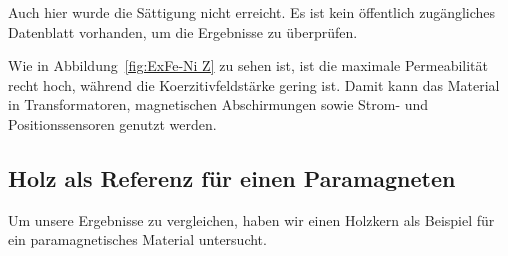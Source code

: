 \documentclass[a4paper,10pt,twocolumn]{article}
\begin{document}
    Auch hier wurde die Sättigung nicht erreicht.
    Es ist kein öffentlich zugängliches Datenblatt vorhanden, um die Ergebnisse zu überprüfen.

    Wie in Abbildung~\ref{fig:ExFe-Ni Z} zu sehen ist, ist die maximale Permeabilität recht hoch, während
    die Koerzitivfeldstärke gering ist.
    Damit kann das Material in Transformatoren, magnetischen Abschirmungen sowie Strom- und Positionssensoren genutzt werden.



    \subsection{Holz als Referenz für einen Paramagneten}
    
    
%    
    
    Um unsere Ergebnisse zu vergleichen, haben wir einen Holzkern als Beispiel für ein paramagnetisches 
    Material untersucht.
    
\end{document}

